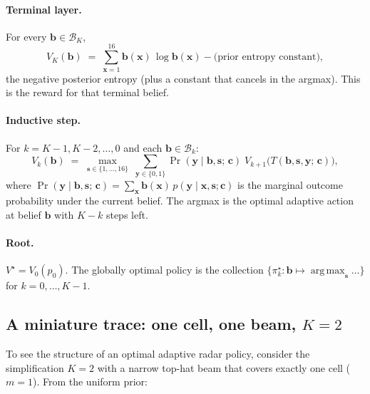 \documentclass[11pt]{article}
\newcommand{\bc}{\bm{c}}
\newcommand{\bx}{\bm{x}}
\newcommand{\by}{\bm{y}}
\newcommand{\bs}{\bm{s}}
\newcommand{\bb}{\bm{b}}
\newcommand{\argmax}{\operatorname*{arg\,max}}
\begin{document}
\paragraph{Terminal layer.}  For every $\bb \in \mathcal{B}_K$,
\begin{equation}
V_K(\bb) \;=\; \sum_{\bx = 1}^{16} \bb(\bx)\, \log \bb(\bx) - \text{(prior entropy constant)},
\label{eq:radar_terminal}
\end{equation}
the negative posterior entropy (plus a constant that cancels in the argmax).  This is the reward for that terminal belief.

\paragraph{Inductive step.}  For $k = K-1, K-2, \ldots, 0$ and each $\bb \in \mathcal{B}_k$:
\begin{equation}
V_k(\bb) \;=\; \max_{\bs \in \{1, \ldots, 16\}}\; \sum_{\by \in \{0, 1\}} \Pr(\by \mid \bb, \bs;\, \bc)\; V_{k+1}\bigl(T(\bb, \bs, \by;\, \bc)\bigr),
\label{eq:radar_backup}
\end{equation}
where $\Pr(\by \mid \bb, \bs;\, \bc) = \sum_{\bx} \bb(\bx)\, p(\by \mid \bx, \bs; \bc)$ is the marginal outcome probability under the current belief.  The argmax is the optimal adaptive action at belief $\bb$ with $K - k$ steps left.

\paragraph{Root.}  $V^\star = V_0(p_0)$.  The globally optimal policy is the collection $\{\pi^\star_k : \bb \mapsto \argmax_{\bs} \ldots\}$ for $k = 0, \ldots, K-1$.

\subsection{A miniature trace: one cell, one beam, \texorpdfstring{$K = 2$}{K=2}}

To see the structure of an optimal adaptive radar policy, consider the simplification $K = 2$ with a narrow top-hat beam that covers exactly one cell ($m = 1$).  From the uniform prior:
\end{document}
